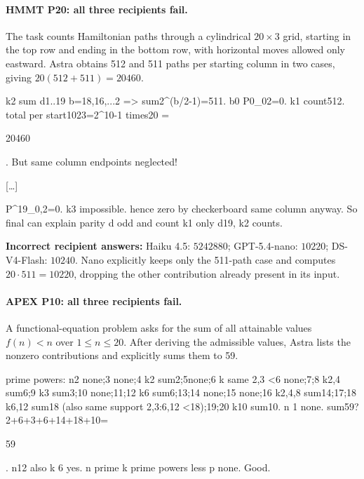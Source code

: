 \paragraph{HMMT P20: all three recipients fail.}
The task counts Hamiltonian paths through a cylindrical $20\times3$ grid, starting in the top row and ending in the bottom row, with horizontal moves allowed only eastward.
Astra obtains 512 and 511 paths per starting column in two cases, giving $20(512+511)=20460$.

\begin{tcolorbox}[title={Astra Extracted CoT},colback=white,colframe=black!40,boxrule=0.4pt,arc=1mm,breakable,fontupper=\small\ttfamily,fonttitle=\small\bfseries,left=2mm,right=2mm,top=1mm,bottom=1mm]
k2 sum d1..19 b=18,16,...2 => sum2\textasciicircum{}(b/2-1)=511. b0 P0\_02=0. k1 count512. total per start1023=2\textasciicircum{}10-1 times20 =\colorbox{yellow!45}{\strut 20460}. But same column endpoints neglected!

[\ldots]

P\textasciicircum{}19\_0,2=0. k3 impossible. hence zero by checkerboard same column anyway. So final can explain parity d odd and count k1 only d19, k2 counts.
\end{tcolorbox}

\noindent\textbf{Incorrect recipient answers:} Haiku 4.5: $5242880$; GPT-5.4-nano: $10220$; DS-V4-Flash: $10240$.
Nano explicitly keeps only the 511-path case and computes $20\cdot511=10220$, dropping the other contribution already present in its input.

\paragraph{APEX P10: all three recipients fail.}
A functional-equation problem asks for the sum of all attainable values $f(n)<n$ over $1\leq n\leq20$.
After deriving the admissible values, Astra lists the nonzero contributions and explicitly sums them to 59.

\begin{tcolorbox}[title={Astra Extracted CoT},colback=white,colframe=black!40,boxrule=0.4pt,arc=1mm,breakable,fontupper=\small\ttfamily,fonttitle=\small\bfseries,left=2mm,right=2mm,top=1mm,bottom=1mm]
prime powers: n2 none;3 none;4 k2 sum2;5none;6 k same 2,3 <6 none;7;8 k2,4 sum6;9 k3 sum3;10 none;11;12 k6 sum6;13;14 none;15 none;16 k2,4,8 sum14;17;18 k6,12 sum18 (also same support 2,3:6,12 <18);19;20 k10 sum10. n 1 none. sum59?2+6+3+6+14+18+10=\colorbox{yellow!45}{\strut 59}. n12 also k 6 yes. n prime k prime powers less p none. Good.
\end{tcolorbox}

